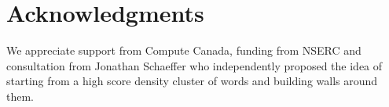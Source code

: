 \section*{Acknowledgments}

We appreciate support from Compute Canada, funding from NSERC and consultation from Jonathan Schaeffer who independently proposed the idea of starting from a high score density cluster of words and building walls around them.
